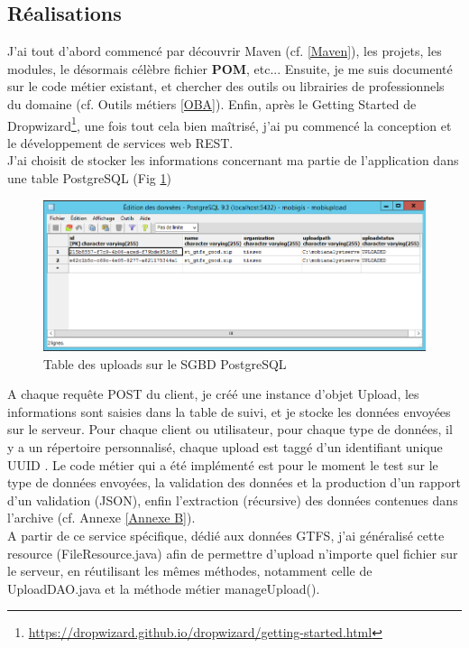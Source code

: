 \begin{itemize}
\subsection{Réalisations}

J'ai tout d'abord commencé par découvrir Maven (cf. \ref{Maven}), les projets, les modules, le désormais célèbre fichier \textbf{POM}, etc...
Ensuite, je me suis documenté sur le code métier existant, et chercher des outils ou librairies de professionnels du domaine (cf. Outils métiers \ref{OBA}).
Enfin, après le \og Getting Started \fg de Dropwizard\footnote{\url{https://dropwizard.github.io/dropwizard/getting-started.html}}, une fois tout cela bien maîtrisé, j'ai pu commencé la conception et le développement de services web REST.\\

J'ai choisit de stocker les informations concernant ma partie de l'application dans une table PostgreSQL (Fig \ref{TablePostgres})\\
\begin{figure}[!h]
\centering
\includegraphics[width=14cm]{images/tablePostgres_mobiupload_small.png}
\caption{\label{TablePostgres}Table des uploads sur le SGBD PostgreSQL}
\end{figure} 

A chaque requête POST du client, je créé une instance d'objet Upload, les informations sont saisies dans la table de suivi, et je stocke les données envoyées sur le serveur. Pour chaque client ou utilisateur, pour chaque type de données, il y a un répertoire personnalisé, chaque upload est \og taggé \fg d'un identifiant unique \og UUID \fg.
Le code métier qui a été implémenté est pour le moment le test sur le type de données envoyées, la validation des données et la production d'un rapport d'un validation (JSON), enfin l'extraction (récursive) des données contenues dans l'archive (cf. Annexe \ref{Annexe B}).\\

A partir de ce service spécifique, dédié aux données GTFS, j'ai généralisé cette resource (FileResource.java) afin de permettre d'upload n'importe quel fichier sur le serveur, en réutilisant les mêmes méthodes, notamment celle de UploadDAO.java et la méthode \og métier \fg manageUpload().\\


\end{itemize}
